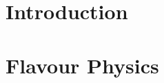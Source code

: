 \documentclass[
	fontsize=10pt, %
	twoside=false, %
	numbers=noenddot, %
]{kaobook}
\begin{document}
\mainmatter %

\part{Introduction}

\part{Flavour Physics}


% 
% 
% 
% 
% 
% 


%


\backmatter %


\nocite{schwartz}
\nocite{introQCD}
\nocite{SS}
\nocite{Sr}
\printbibliography[heading=bibintoc, title=References] %
\end{document}
